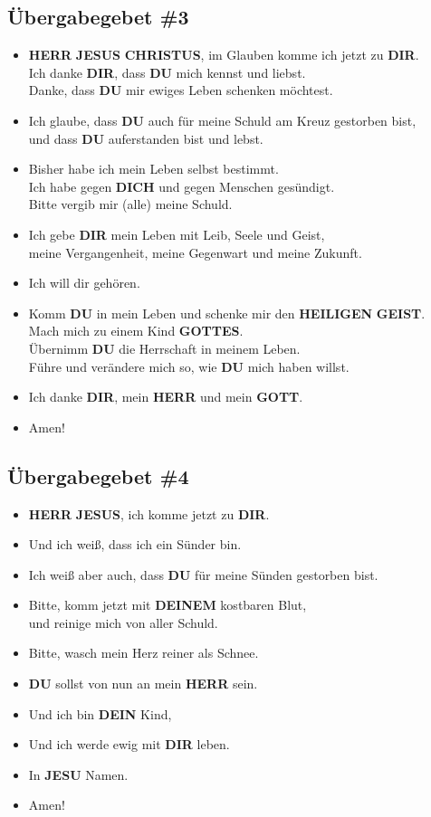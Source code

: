 \documentclass[12pt,a5paper]{article}
\newcommand{\Christus}[0]{\textbf{CHRISTUS}}
\newcommand{\Deinem}[0]{\textbf{DEINEM}}
\newcommand{\Dein}[0]{\textbf{DEIN}}
\newcommand{\Dich}[0]{\textbf{DICH}}
\newcommand{\Dir}[0]{\textbf{DIR}}
\newcommand{\Du}[0]{\textbf{DU}}
\newcommand{\Geist}[0]{\textbf{GEIST}}
\newcommand{\Gottes}[0]{\textbf{GOTTES}}
\newcommand{\Gott}[0]{\textbf{GOTT}}
\newcommand{\Heiligen}[0]{\textbf{HEILIGEN}}
\newcommand{\Herr}[0]{\textbf{HERR}}
\newcommand{\Jesus}[0]{\textbf{JESUS}}
\newcommand{\Jesu}[0]{\textbf{JESU}}
\begin{document}
	\subsection{\"Ubergabegebet \#3}
		\begin{itemize}[nosep]
			\item	{\Herr} {\Jesus} {\Christus},
					im Glauben komme ich jetzt zu {\Dir}.
			\\		Ich danke {\Dir},
					dass {\Du} mich kennst und liebst.
			\\		Danke,
					dass {\Du} mir ewiges Leben schenken m\"ochtest.
			\item	Ich glaube,
					dass {\Du} auch f\"ur meine Schuld am Kreuz gestorben bist,
			\\		und dass {\Du} auferstanden bist und lebst.
			\item	Bisher habe ich mein Leben selbst bestimmt.
			\\		Ich habe gegen {\Dich} und gegen Menschen ges\"undigt.
			\\		Bitte vergib mir (alle) meine Schuld.
			\item	Ich gebe {\Dir} mein Leben mit Leib,
					Seele und Geist,
			\\		meine Vergangenheit,
					meine Gegenwart und meine Zukunft.
			\item	Ich will dir geh\"oren.
			\item	Komm {\Du} in mein Leben und schenke mir den {\Heiligen} {\Geist}.
			\\		Mach mich zu einem Kind {\Gottes}.
			\\		\"Ubernimm {\Du} die Herrschaft in meinem Leben.
			\\		F\"uhre und ver\"andere mich so,
					wie {\Du} mich haben willst.
			\item	Ich danke {\Dir},
					mein {\Herr} und mein {\Gott}.
			\item	Amen!
		\end{itemize}
		
	\subsection{\"Ubergabegebet \#4}
		\begin{itemize}[nosep]
			\item	{\Herr} {\Jesus},
					ich komme jetzt zu {\Dir}.
			\item	Und ich wei{\ss},
					dass ich ein S\"under bin.
			\item	Ich wei{\ss} aber auch,
					dass {\Du} f\"ur meine S\"unden gestorben bist.
			\item	Bitte, komm jetzt mit {\Deinem} kostbaren Blut,
			\\		und reinige mich von aller Schuld.
			\item	Bitte, wasch mein Herz reiner als Schnee.
			\item	{\Du} sollst von nun an mein {\Herr} sein.
			\item	Und ich bin {\Dein} Kind,
			\item	Und ich werde ewig mit {\Dir} leben.
			\item	In {\Jesu} Namen.
			\item	Amen!
		\end{itemize}
	
\end{document}

